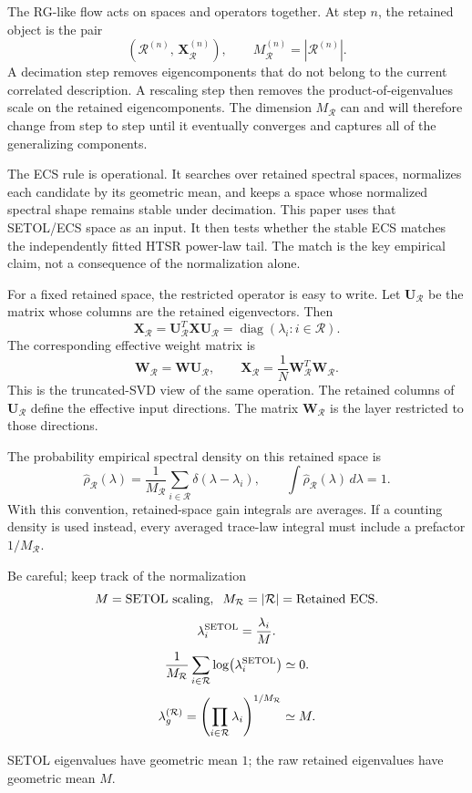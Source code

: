 \documentclass[10pt,twocolumn]{article}
\newcommand{\diag}{\operatorname{diag}}
\newcommand{\dd}{\,d}
\newcommand{\W}{\mathbf W}
\newcommand{\X}{\mathbf X}
\newcommand{\U}{\mathbf U}
\newcommand{\Rell}{\mathcal R}
\newcommand{\rhohat}{\widehat\rho}
\newcommand{\Mred}{M_{\Rell}}
\newcommand{\takeaway}[1]{%
  \par\vspace{4pt}\noindent\textcolor{boxblue}{#1}%
}
\newcommand{\eqtight}[1]{\[\vspace{-1pt}#1\vspace{-3pt}\]}
\begin{document}
The RG-like flow acts on spaces and operators together. At step $n$, the retained object is the pair
\begin{equation}
\left(\mathcal R^{(n)},\,\X_{\Rell}^{(n)}\right),
\qquad
\Mred^{(n)}=|\mathcal R^{(n)}|.
\label{eq:flowpair}
\end{equation}
A decimation step removes eigencomponents that do not belong to the current correlated description.
A rescaling step then removes the product-of-eigenvalues scale on the retained eigencomponents.
The dimension $\Mred$  can and will therefore change from step to step until it eventually converges and captures
all of the generalizing components.

The ECS rule is operational. It searches over retained spectral spaces, normalizes each candidate by its geometric mean, and keeps a space whose normalized spectral shape remains stable under decimation. This paper uses that SETOL/ECS space as an input. It then tests whether the stable ECS matches the independently fitted HTSR power-law tail. The match is the key empirical claim, not a consequence of the normalization alone.

For a fixed retained space, the restricted operator is easy to write. Let $\U_{\Rell}$ be the matrix whose columns are the retained eigenvectors. Then
\begin{equation}
\X_{\Rell}=\U_{\Rell}^T\X\U_{\Rell}
=\diag(\lambda_i:i\in\Rell).
\label{eq:restricted_operator}
\end{equation}
The corresponding effective weight matrix is
\begin{equation}
\W_{\Rell}=\W\U_{\Rell},
\qquad
\X_{\Rell}=\frac{1}{N}\W_{\Rell}^T\W_{\Rell} .
\label{eq:effective_weight}
\end{equation}
This is the truncated-SVD view of the same operation. The retained columns of $\U_{\Rell}$ define the effective input directions. The matrix $\W_{\Rell}$ is the layer restricted to those directions.

The probability empirical spectral density on this retained space is
\begin{equation}
\rhohat_{\Rell}(\lambda)=\frac{1}{\Mred}\sum_{i\in\Rell}\delta(\lambda-\lambda_i),
\qquad
\int\rhohat_{\Rell}(\lambda)\dd\lambda=1.
\label{eq:prob_esd}
\end{equation}
With this convention, retained-space gain integrals are averages. If a counting density is used instead, every averaged trace-law integral must include a prefactor $1/\Mred$.

\begin{tcolorbox}[marginalbox,title=\textbf{11. The trace-log scale convention}]
Be careful; keep track of the normalization
\eqtight{M=\text{SETOL scaling},\;\;M_{\Rell}=|\mathcal R|=\text{Retained ECS}.} 
\eqtight{\lambda_i^{\rm SETOL}=\frac{\lambda_i}{M}.}
\eqtight{\frac{1}{M_{\Rell}}\sum_{i\in\mathcal R}\log\!\left(\lambda^{\rm SETOL}_i\right)\simeq0.}
\eqtight{\lambda_g^{(\mathcal R)}=\left(\prod_{i\in\mathcal R}\lambda_i\right)^{1/M_{\Rell}}\simeq M.}
\takeaway{SETOL eigenvalues have geometric mean $1$; the raw retained eigenvalues have geometric mean $M$.}
\end{tcolorbox}
\end{document}
